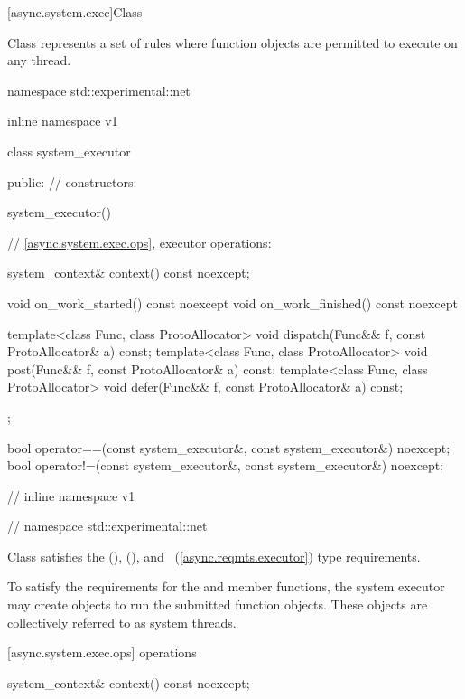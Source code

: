 [async.system.exec]{Class }

%
\pnum
Class  represents a set of rules where function objects are permitted to execute on any thread.

\begin{codeblock}
namespace std::experimental::net {
inline namespace v1 {

  class system_executor
  {
  public:
    // constructors:

    system_executor() {}

    // \ref{async.system.exec.ops}, executor operations:

    system_context& context() const noexcept;

    void on_work_started() const noexcept {}
    void on_work_finished() const noexcept {}

    template<class Func, class ProtoAllocator>
      void dispatch(Func&& f, const ProtoAllocator& a) const;
    template<class Func, class ProtoAllocator>
      void post(Func&& f, const ProtoAllocator& a) const;
    template<class Func, class ProtoAllocator>
      void defer(Func&& f, const ProtoAllocator& a) const;
  };

  bool operator==(const system_executor&, const system_executor&) noexcept;
  bool operator!=(const system_executor&, const system_executor&) noexcept;

} // inline namespace v1
} // namespace std::experimental::net
\end{codeblock}

\pnum
Class  satisfies the  (),  (), and ~(\ref{async.reqmts.executor}) type requirements.

\pnum
To satisfy the  requirements for the  and  member functions, the system executor may create  objects to run the submitted function objects. These  objects are collectively referred to as system threads.


[async.system.exec.ops]{ operations}

%
\begin{itemdecl}
system_context& context() const noexcept;
\end{itemdecl}

